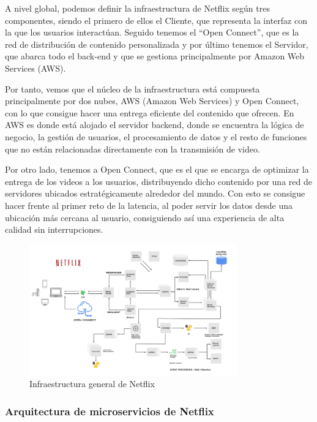 \documentclass[12pt,a4paper]{article}
\begin{document}
    A nivel global, podemos definir la infraestructura de Netflix según tres componentes, siendo el primero de ellos el Cliente, que representa la interfaz con la que los usuarios interactúan. Seguido tenemos el “Open Connect”, que es la red de distribución de contenido personalizada y por último tenemos el Servidor, que abarca todo el back-end y que se gestiona principalmente por Amazon Web Services (AWS). \cite{boettger2018}

    Por tanto, vemos que el núcleo de la infraestructura está compuesta principalmente por dos nubes, AWS (Amazon Web Services) y Open Connect, con lo que consigue hacer una entrega eficiente del contenido que ofrecen. En AWS es donde está alojado el servidor backend, donde se encuentra la lógica de negocio, la gestión de usuarios, el procesamiento de datos y el resto de funciones que no están relacionadas directamente con la transmisión de video. 
    
    Por otro lado, tenemos a Open Connect, que es el que se encarga de optimizar la entrega de los videos a los usuarios, distribuyendo dicho contenido por una red de servidores ubicados estratégicamente alrededor del mundo. Con esto se consigue hacer frente al primer reto de la latencia, al poder servir los datos desde una ubicación más cercana al usuario, consiguiendo así una experiencia de alta calidad sin interrupciones.

    \begin{figure}[H]
        \centering
        \includegraphics[width=0.8\textwidth]{./img/infraestructura_netflix.png}
        \caption{Infraestructura general de Netflix}
        \label{fig:netflix_infra}
    \end{figure}


    \subsubsection{Arquitectura de microservicios de Netflix}
\end{document}
